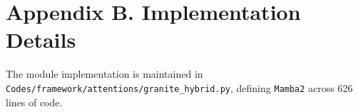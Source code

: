 \section*{Appendix B. Implementation Details}
The module implementation is maintained in \texttt{Codes/framework/attentions/granite\_hybrid.py}, defining \texttt{Mamba2} across 626 lines of code.
